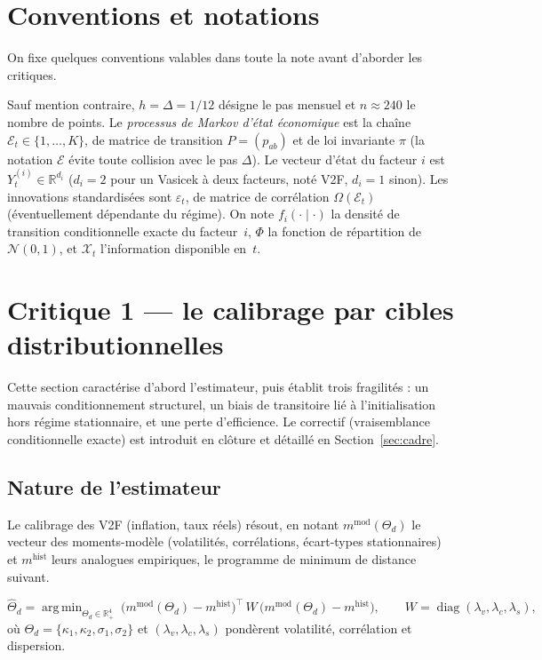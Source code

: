 \documentclass[11pt,a4paper]{article}
\theoremstyle{definition}
\DeclareMathOperator{\diag}{diag}
\DeclareMathOperator*{\argmin}{arg\,min}
\newcommand{\R}{\mathbb{R}}
\newcommand{\Ecal}{\mathcal{E}}
\newcommand{\Ncal}{\mathcal{N}}
\newcommand{\Xcal}{\mathcal{X}}
\newcommand{\eps}{\varepsilon}
\newcommand{\transp}{^{\!\top}}
\begin{document}
\section{Conventions et notations}

On fixe quelques conventions valables dans toute la note avant d'aborder les critiques.

Sauf mention contraire, $h=\Delta=1/12$ désigne le pas mensuel et $n\approx 240$ le nombre de points. Le \emph{processus de Markov d'état économique} est la chaîne $\Ecal_t\in\{1,\dots,K\}$, de matrice de transition $P=(p_{ab})$ et de loi invariante $\pi$ (la notation $\Ecal$ évite toute collision avec le pas $\Delta$). Le vecteur d'état du facteur $i$ est $Y^{(i)}_t\in\R^{d_i}$ ($d_i=2$ pour un Vasicek à deux facteurs, noté V2F, $d_i=1$ sinon). Les innovations standardisées sont $\eps_t$, de matrice de corrélation $\Omega(\Ecal_t)$ (éventuellement dépendante du régime). On note $f_i(\cdot\mid\cdot)$ la densité de transition conditionnelle exacte du facteur~$i$, $\Phi$ la fonction de répartition de $\Ncal(0,1)$, et $\Xcal_t$ l'information disponible en~$t$.

\section{Critique 1 --- le calibrage par cibles distributionnelles}

Cette section caractérise d'abord l'estimateur, puis établit trois fragilités : un mauvais conditionnement structurel, un biais de transitoire lié à l'initialisation hors régime stationnaire, et une perte d'efficience. Le correctif (vraisemblance conditionnelle exacte) est introduit en clôture et détaillé en Section~\ref{sec:cadre}.

\subsection{Nature de l'estimateur}

Le calibrage des V2F (inflation, taux réels) résout, en notant $m^{\mathrm{mod}}(\Theta_d)$ le vecteur des moments-modèle (volatilités, corrélations, écart-types stationnaires) et $m^{\mathrm{hist}}$ leurs analogues empiriques, le programme de minimum de distance suivant.

\begin{definitionbox}
\[
\hat\Theta_d=\argmin_{\Theta_d\in\R^4_+}\ \big(m^{\mathrm{mod}}(\Theta_d)-m^{\mathrm{hist}}\big)\transp\,W\,\big(m^{\mathrm{mod}}(\Theta_d)-m^{\mathrm{hist}}\big),
\qquad W=\diag(\lambda_v,\lambda_c,\lambda_s),
\]
où $\Theta_d=\{\kappa_1,\kappa_2,\sigma_1,\sigma_2\}$ et $(\lambda_v,\lambda_c,\lambda_s)$ pondèrent volatilité, corrélation et dispersion.
\end{definitionbox}
\end{document}
